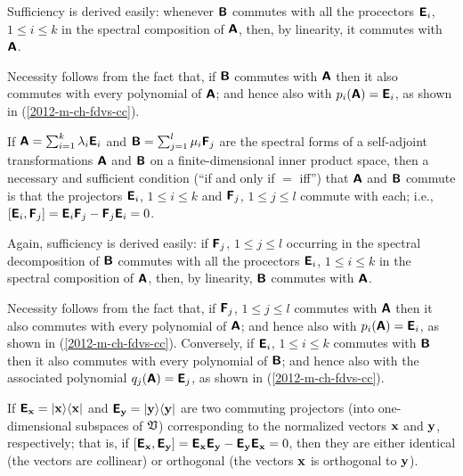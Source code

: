 {\color{OliveGreen}\bproof
Sufficiency is derived easily: whenever   $\textsf{\textbf{B}}$
commutes with all the procectors $\textsf{\textbf{E}}_i$, $1\le i\le k$
in the spectral composition of   $\textsf{\textbf{A}}$,
then, by linearity, it commutes with $\textsf{\textbf{A}}$.

Necessity follows from the fact that, if  $\textsf{\textbf{B}}$
commutes with  $\textsf{\textbf{A}}$
then it also commutes with every polynomial of  $\textsf{\textbf{A}}$;
and hence also with $p_i(\textsf{\textbf{A}})=\textsf{\textbf{E}}_i$,
as shown in (\ref{2012-m-ch-fdvs-cc}).
\eproof
}

If $\textsf{\textbf{A}}=\sum_{i=1}^k \lambda_i\textsf{\textbf{E}}_i$
and
$\textsf{\textbf{B}}=\sum_{j=1}^l \mu_i\textsf{\textbf{F}}_j$
are the spectral forms of a self-adjoint transformations
$\textsf{\textbf{A}}$ and $\textsf{\textbf{B}}$
on a finite-dimensional inner product space,
then a necessary and sufficient condition (``if and only if $=$ iff'')
that  $\textsf{\textbf{A}}$ and
 $\textsf{\textbf{B}}$ commute
is that the projectors
$\textsf{\textbf{E}}_i$, $1\le i\le k$
and
$\textsf{\textbf{F}}_j$, $1\le j\le l$
commute with each; i.e.,
$\left[\textsf{\textbf{E}}_i,\textsf{\textbf{F}}_j\right] =
\textsf{\textbf{E}}_i \textsf{\textbf{F}}_j-
\textsf{\textbf{F}}_j\textsf{\textbf{E}}_i =0 $.

{\color{OliveGreen}\bproof
Again, sufficiency is derived easily: if $\textsf{\textbf{F}}_j$, $1\le j\le l$
occurring in the spectral decomposition of $\textsf{\textbf{B}}$
commutes with all the procectors $\textsf{\textbf{E}}_i$, $1\le i\le k$
in the spectral composition of   $\textsf{\textbf{A}}$,
then, by linearity, $\textsf{\textbf{B}}$ commutes with $\textsf{\textbf{A}}$.

Necessity follows from the fact that, if $\textsf{\textbf{F}}_j$, $1\le j\le l$
commutes with  $\textsf{\textbf{A}}$
then it also commutes with every polynomial of  $\textsf{\textbf{A}}$;
and
hence also with $p_i(\textsf{\textbf{A}})=\textsf{\textbf{E}}_i$,
as shown in (\ref{2012-m-ch-fdvs-cc}).
Conversely,
if $\textsf{\textbf{E}}_i$, $1\le i\le k$
commutes with  $\textsf{\textbf{B}}$
then it also commutes with every polynomial of  $\textsf{\textbf{B}}$;
and
hence also with the associated polynomial
$q_j(\textsf{\textbf{A}})=\textsf{\textbf{E}}_j$,
as shown in (\ref{2012-m-ch-fdvs-cc}).
\eproof
}



If
$\textsf{\textbf{E}}_{\bf x} = \vert {\bf x} \rangle \langle {\bf x} \vert$
and
$\textsf{\textbf{E}}_{\bf y} = \vert {\bf y} \rangle \langle {\bf y} \vert$
are two commuting projectors (into one-dimensional subspaces of ${\frak V}$)
corresponding to the normalized vectors ${\bf x}$  and ${\bf y}$,
respectively; that is, if
$\left[
\textsf{\textbf{E}}_{\bf x}
,
\textsf{\textbf{E}}_{\bf y}
\right]=
\textsf{\textbf{E}}_{\bf x}
\textsf{\textbf{E}}_{\bf y}
-
\textsf{\textbf{E}}_{\bf y}
\textsf{\textbf{E}}_{\bf x}
=0$,
then they are either identical (the vectors are collinear) or orthogonal (the vectors ${\bf x}$ is orthogonal to ${\bf y}$).


